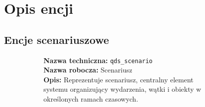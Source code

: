 \section{Opis encji}

\subsection{Encje scenariuszowe}

\begin{figure}[H]
    \begin{minipage}{\textwidth}
        \centering

        \begin{figure}[H]
            \centering
            \begin{minipage}{0.8\textwidth}
                \begin{framed}
                    \noindent\textbf{\large Nazwa techniczna:} \texttt{qds\_scenario} \\
                    \textbf{\large Nazwa robocza:} Scenariusz \\
                    \textbf{\large Opis:} Reprezentuje scenariusz, centralny element systemu organizujący
                    wydarzenia, wątki i obiekty w określonych ramach czasowych.
                \end{framed}
            \end{minipage}
        \end{figure}



\end{minipage}
\end{figure}

